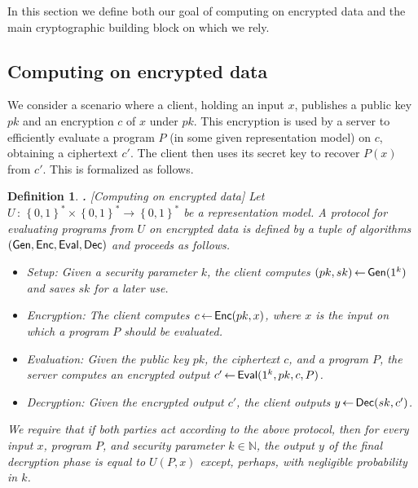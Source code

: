 \documentclass[11pt]{article}
\newcommand{\fnrngdom}[2]{#1\to#2}
\newcommand{\fndef}[3]{{#1\,:\,\fnrngdom{#2}{#3}}}
\newcommand{\set}[1]{\left\{#1\right\}}
\newtheorem{DEFINITION}{Definition}[section]
\newenvironment{definition}{\begin{DEFINITION} \hspace{-.85em} {\bf .} \rm}%
	{\end{DEFINITION}}
\newcommand{\from}{{\,\leftarrow\,}}
\newcommand{\samp}[2]{#1\from #2}
\newcommand{\bools}[1][]{{\set{0,1}}^{#1}}
\newcommand{\bp}{\mbox{BP}\;}
\newcommand{\gen}{{\sf Gen}}
\newcommand{\enc}{{\sf Enc}}
\newcommand{\eval}{{\sf Eval}}
\newcommand{\dec}{{\sf Dec}}
\newcommand{\N}{{\mathbb{N}}}
\newcommand{\ot}{\mbox{OT}\;}
\begin{document}
In this section we define both our goal of computing on encrypted
data and the main cryptographic building block on which we rely.

\subsection{Computing on encrypted data} \label{sec-clientserver}

We consider a scenario where a client, holding an input $x$,
publishes a public key $pk$ and an encryption $c$ of $x$ under $pk$.
This encryption is used by a server to efficiently evaluate a
program $P$ (in some given representation model) on $c$, obtaining a
ciphertext $c'$. The client then uses its secret key to recover
$P(x)$ from $c'$. This is formalized as follows.


\begin{definition}[Computing on encrypted data]
\label{def-cl-serv} Let
$\fndef{U}{\bools[*]\times\bools[*]}{\bools[*]}$ be a
representation model. A {\em protocol for evaluating programs from
$U$ on encrypted data} is defined by a tuple of algorithms
$(\gen,\enc,\eval,\dec)$ and proceeds as follows.
\begin{itemize}
\item {\sc Setup:} Given a security parameter $k$,
the client computes $\samp{(pk,sk)}{\gen(1^k)}$ and saves $sk$ for a
later use.
\item {\sc Encryption:} The client
computes $\samp{c}\enc(pk,x)$, where $x$ is the input on which a
program $P$ should be evaluated.
\item {\sc Evaluation:} Given the public key
$pk$, the ciphertext $c$, and a program $P$, the server computes an
encrypted output $\samp{c'}{\eval(1^k,pk,c,P)}$.
\item {\sc Decryption:} Given the
encrypted output $c'$, the client outputs $\samp{y}{\dec(sk,c')}$.
\end{itemize}
We require that if both parties act according to the above protocol,
then for every input $x$, program $P$, and security parameter
$k\in{\N}$, the output $y$ of the final decryption phase is equal to
$U(P,x)$ except, perhaps, with negligible probability in $k$.
\end{definition}
\end{document}
